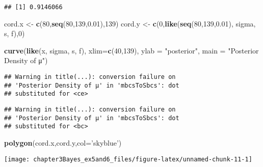 \documentclass[]{tufte-handout}
\newenvironment{Shaded}{}{}
\newcommand{\KeywordTok}[1]{\textcolor[rgb]{0.00,0.44,0.13}{\textbf{{#1}}}}
\newcommand{\DataTypeTok}[1]{\textcolor[rgb]{0.56,0.13,0.00}{{#1}}}
\newcommand{\DecValTok}[1]{\textcolor[rgb]{0.25,0.63,0.44}{{#1}}}
\newcommand{\FloatTok}[1]{\textcolor[rgb]{0.25,0.63,0.44}{{#1}}}
\newcommand{\StringTok}[1]{\textcolor[rgb]{0.25,0.44,0.63}{{#1}}}
\newcommand{\CommentTok}[1]{\textcolor[rgb]{0.38,0.63,0.69}{\textit{{#1}}}}
\newcommand{\NormalTok}[1]{{#1}}
\begin{document}
\begin{Shaded}
\end{Shaded}

\begin{verbatim}
## [1] 0.9146066
\end{verbatim}

\begin{Shaded}
\begin{Highlighting}[]
\NormalTok{cord.x <-}\StringTok{ }\KeywordTok{c}\NormalTok{(}\DecValTok{80}\NormalTok{,}\KeywordTok{seq}\NormalTok{(}\DecValTok{80}\NormalTok{,}\DecValTok{139}\NormalTok{,}\FloatTok{0.01}\NormalTok{),}\DecValTok{139}\NormalTok{) }
\NormalTok{cord.y <-}\StringTok{ }\KeywordTok{c}\NormalTok{(}\DecValTok{0}\NormalTok{,}\KeywordTok{like}\NormalTok{(}\KeywordTok{seq}\NormalTok{(}\DecValTok{80}\NormalTok{,}\DecValTok{139}\NormalTok{,}\FloatTok{0.01}\NormalTok{), sigma, s, f),}\DecValTok{0}\NormalTok{) }

\KeywordTok{curve}\NormalTok{(}\KeywordTok{like}\NormalTok{(x, sigma, s, f), }\DataTypeTok{xlim=}\KeywordTok{c}\NormalTok{(}\DecValTok{40}\NormalTok{,}\DecValTok{139}\NormalTok{), }\DataTypeTok{ylab =} \StringTok{"posterior"}\NormalTok{, }\DataTypeTok{main =} \StringTok{"Posterior Density of μ"}\NormalTok{)}
\end{Highlighting}
\end{Shaded}

\begin{verbatim}
## Warning in title(...): conversion failure on
## 'Posterior Density of μ' in 'mbcsToSbcs': dot
## substituted for <ce>
\end{verbatim}

\begin{verbatim}
## Warning in title(...): conversion failure on
## 'Posterior Density of μ' in 'mbcsToSbcs': dot
## substituted for <bc>
\end{verbatim}

\begin{Shaded}
\begin{Highlighting}[]
\KeywordTok{polygon}\NormalTok{(cord.x,cord.y,}\DataTypeTok{col=}\StringTok{'skyblue'}\NormalTok{)}
\end{Highlighting}
\end{Shaded}

\texttt{[image: chapter3Bayes\_ex5and6\_files/figure-latex/unnamed-chunk-11-1]}


\end{document}
